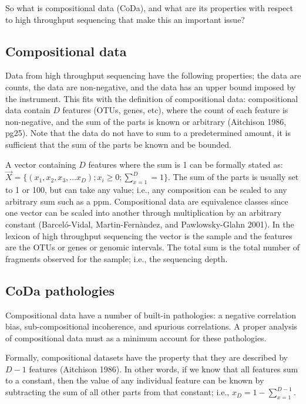 \documentclass[onecolumn]{article}
\begin{document}
So what is compositional data (CoDa), and what are its properties with respect to high throughput sequencing that make this an important issue?

\hypertarget{compositional-data}{%
\subsection{Compositional data}\label{compositional-data}}

Data from high throughput sequencing have the following properties; the data are counts, the data are non-negative, and the data has an upper bound imposed by the instrument. This fits with the definition of compositional data: compositional data contain \(D\) features (OTUs, genes, etc), where the count of each feature is non-negative, and the sum of the parts is known or arbitrary (Aitchison 1986, pg25). Note that the data do not have to sum to a predetermined amount, it is sufficient that the sum of the parts be known and be bounded.

A vector containing \(D\) features where the sum is 1 can be formally stated as: \(\vec{X} = \{(x_1,x_2,x_3, \ldots x_D); x_i\ge 0; \sum_{x=1}^{D} = 1\}\). The sum of the parts is usually set to 1 or 100, but can take any value; i.e., any composition can be scaled to any arbitrary sum such as a ppm. Compositional data are equivalence classes since one vector can be scaled into another through multiplication by an arbitrary constant (Barceló-Vidal, Martin-Fernàndez, and Pawlowsky-Glahn 2001). In the lexicon of high throughput sequencing the vector is the sample and the features are the OTUs or genes or genomic intervals. The total sum is the total number of fragments observed for the sample; i.e., the sequencing depth.

\hypertarget{coda-pathologies}{%
\subsection{CoDa pathologies}\label{coda-pathologies}}

Compositional data have a number of built-in pathologies: a negative correlation bias, sub-compositional incoherence, and spurious correlations. A proper analysis of compositional data must as a minimum account for these pathologies.

Formally, compositional datasets have the property that they are described by \(D-1\) features (Aitchison 1986). In other words, if we know that all features sum to a constant, then the value of any individual feature can be known by subtracting the sum of all other parts from that constant; i.e., \(x_D = 1-\sum_{x=1}^{D-1}\).
\end{document}
